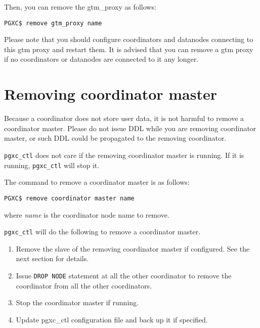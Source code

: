   Then, you can remove the gtm\_proxy as follows:
  
  \begin{lstlisting}[frame=single]
PGXC$ remove gtm_proxy name
  \end{lstlisting}
  
  Please note that you should configure coordinators and datanodes connecting to this gtm
  proxy and restart them.
  It is advised that you can remove a gtm proxy if no coordinators or datanodes are connected
  to it any longer.



  \section{\label{pgxcCtl:removeCoordMaster}Removing coordinator master}
  
  Because a coordinator does not store user data, it is not harmful to remove a coordinator master.
  Please do not issue DDL while you are removing coordinator master, or such DDL could be
  propagated to the removing coordinator.
  
  \verb|pgxc_ctl| does not care if the removing coordinator master is running.
  If it is running, \verb|pgxc_ctl| will stop it.
  
  The command to remove a coordinator master is as follows:
  
  \begin{lstlisting}[frame=single]
PGXC$ remove coordinator master name
  \end{lstlisting}
  
  where {\it name} is the coordinator node name to remove.
  
  \verb|pgxc_ctl| will do the following to remove a coordinator master.
  
  \begin{enumerate}
	  \item Remove the slave of the removing coordinator master if configured.
	  		See the next section for details.
	  \item Issue \verb|DROP NODE| statement at all the other coordinator to remove
	  		the coordinator from all the other coordinators.
	  \item Stop the coordinator master if running.
	  \item Update pgxc\_ctl configuration file and back up it if specified.
  \end{enumerate}



